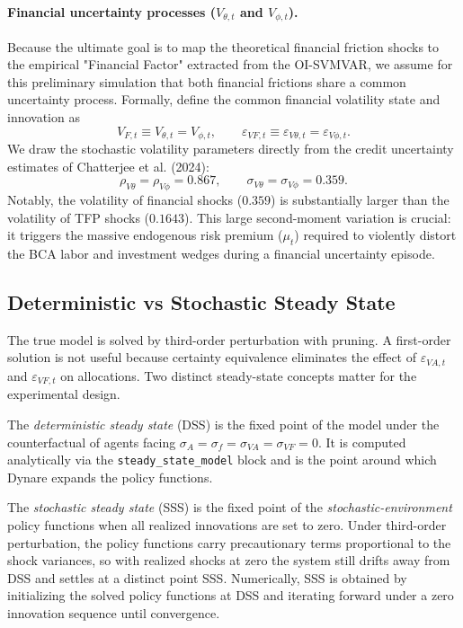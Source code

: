 \paragraph{Financial uncertainty processes (\(V_{\theta,t}\) and \(V_{\phi,t}\)).}
Because the ultimate goal is to map the theoretical financial friction shocks to
the empirical "Financial Factor" extracted from the OI-SVMVAR, we assume for this
preliminary simulation that both financial frictions share a common uncertainty
process. Formally, define the common financial volatility state and innovation as
\[
    V_{F,t}\equiv V_{\theta,t}=V_{\phi,t},
    \qquad
    \varepsilon_{VF,t}\equiv
    \varepsilon_{V\theta,t}=\varepsilon_{V\phi,t}.
\]
We draw the stochastic volatility parameters directly from the credit
uncertainty estimates of Chatterjee et al. (2024):
\[
    \rho_{V\theta} = \rho_{V\phi} = 0.867,\qquad
    \sigma_{V\theta} = \sigma_{V\phi} = 0.359.
\]
Notably, the volatility of financial shocks (\(0.359\)) is substantially larger
than the volatility of TFP shocks (\(0.1643\)). This large second-moment variation
is crucial: it triggers the massive endogenous risk premium (\(\mu_t\)) required
to violently distort the BCA labor and investment wedges during a financial
uncertainty episode.

\subsection{Deterministic vs Stochastic Steady State}

The true model is solved by third-order perturbation with pruning. A first-order
solution is not useful because certainty equivalence eliminates the effect of
\(\varepsilon_{VA,t}\) and \(\varepsilon_{VF,t}\) on allocations. Two distinct
steady-state concepts matter for the experimental design.

The \emph{deterministic steady state} (DSS) is the fixed point of the model
under the counterfactual of agents facing \(\sigma_A=\sigma_f=\sigma_{VA}=\sigma_{VF}=0\).
It is computed analytically via the \texttt{steady\_state\_model} block and is
the point around which Dynare expands the policy functions.

The \emph{stochastic steady state} (SSS) is the fixed point of the
\emph{stochastic-environment} policy functions when all realized innovations
are set to zero. Under third-order perturbation, the policy functions carry
precautionary terms proportional to the shock variances, so with
realized shocks at zero the system still drifts away from DSS and settles at a
distinct point SSS. Numerically, SSS is obtained by initializing the solved
policy functions at DSS and iterating forward under a zero innovation sequence
until convergence.

